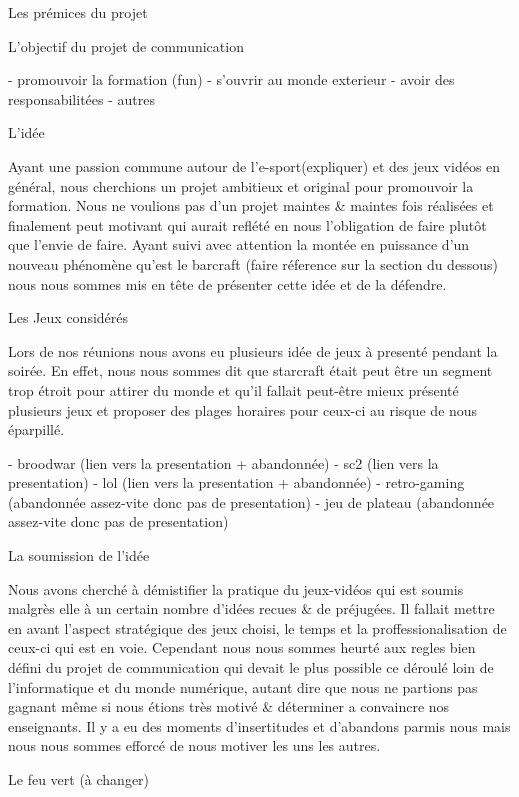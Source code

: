 Les prémices du projet

  L'objectif du projet de communication

    - promouvoir la formation (fun)
    - s'ouvrir au monde exterieur
    - avoir des responsabilitées
    - autres

  L'idée

    Ayant une passion commune autour de l'e-sport(expliquer) et des jeux
    vidéos en général, nous cherchions un projet ambitieux et original
    pour promouvoir la formation. Nous ne voulions pas d'un projet maintes
    & maintes fois réalisées et finalement peut motivant qui aurait
    reflété en nous l'obligation de faire plutôt que l'envie de faire.
    Ayant suivi avec attention la montée en puissance d'un nouveau
    phénomène qu'est le barcraft (faire réference sur la section du
    dessous) nous nous sommes mis en tête de présenter cette idée et de la
    défendre.

  Les Jeux considérés

    Lors de nos réunions nous avons eu plusieurs idée de jeux à presenté
    pendant la soirée. En effet, nous nous sommes dit que starcraft
    était peut être un segment trop étroit pour attirer du monde et
    qu'il fallait peut-être mieux présenté plusieurs jeux et proposer
    des plages horaires pour ceux-ci au risque de nous éparpillé.

    - broodwar (lien vers la presentation + abandonnée)
    - sc2 (lien vers la presentation)
    - lol (lien vers la presentation + abandonnée)
    - retro-gaming (abandonnée assez-vite donc pas de presentation)
    - jeu de plateau (abandonnée assez-vite donc pas de presentation)

  La soumission de l'idée

    Nous avons cherché à démistifier la pratique du jeux-vidéos qui est
    soumis malgrès elle à un certain nombre d'idées recues & de
    préjugées. Il fallait mettre en avant l'aspect stratégique des jeux
    choisi, le temps et la proffessionalisation de ceux-ci qui est en
    voie. Cependant nous nous sommes heurté aux regles bien défini du
    projet de communication qui devait le plus possible ce déroulé loin
    de l'informatique et du monde numérique, autant dire que nous ne
    partions pas gagnant même si nous étions très motivé & déterminer a
    convaincre nos enseignants. Il y a eu des moments d'insertitudes et
    d'abandons parmis nous mais nous nous sommes efforcé de nous motiver
    les uns les autres.

  Le feu vert (à changer)

